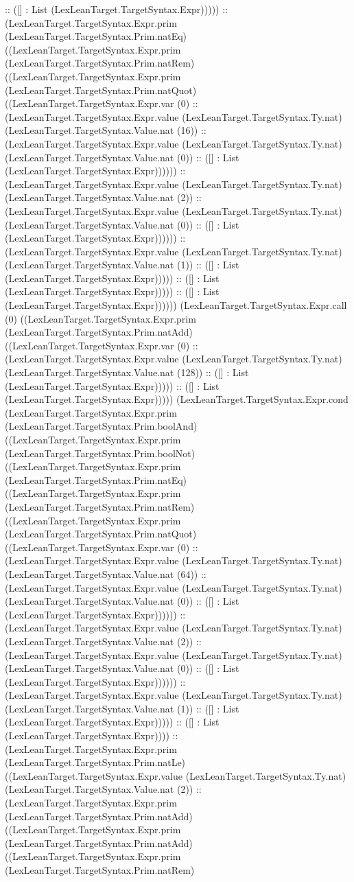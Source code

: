 \documentclass[11pt]{article}
\begin{document}
:: ([] : List (LexLeanTarget.TargetSyntax.Expr))))) :: (LexLeanTarget.TargetSyntax.Expr.prim (LexLeanTarget.TargetSyntax.Prim.natEq) ((LexLeanTarget.TargetSyntax.Expr.prim (LexLeanTarget.TargetSyntax.Prim.natRem) ((LexLeanTarget.TargetSyntax.Expr.prim (LexLeanTarget.TargetSyntax.Prim.natQuot) ((LexLeanTarget.TargetSyntax.Expr.var (0) :: (LexLeanTarget.TargetSyntax.Expr.value (LexLeanTarget.TargetSyntax.Ty.nat) (LexLeanTarget.TargetSyntax.Value.nat (16)) :: (LexLeanTarget.TargetSyntax.Expr.value (LexLeanTarget.TargetSyntax.Ty.nat) (LexLeanTarget.TargetSyntax.Value.nat (0)) :: ([] : List (LexLeanTarget.TargetSyntax.Expr)))))) :: (LexLeanTarget.TargetSyntax.Expr.value (LexLeanTarget.TargetSyntax.Ty.nat) (LexLeanTarget.TargetSyntax.Value.nat (2)) :: (LexLeanTarget.TargetSyntax.Expr.value (LexLeanTarget.TargetSyntax.Ty.nat) (LexLeanTarget.TargetSyntax.Value.nat (0)) :: ([] : List (LexLeanTarget.TargetSyntax.Expr)))))) :: (LexLeanTarget.TargetSyntax.Expr.value (LexLeanTarget.TargetSyntax.Ty.nat) (LexLeanTarget.TargetSyntax.Value.nat (1)) :: ([] : List (LexLeanTarget.TargetSyntax.Expr))))) :: ([] : List (LexLeanTarget.TargetSyntax.Expr))))) :: ([] : List (LexLeanTarget.TargetSyntax.Expr)))))) (LexLeanTarget.TargetSyntax.Expr.call (0) ((LexLeanTarget.TargetSyntax.Expr.prim (LexLeanTarget.TargetSyntax.Prim.natAdd) ((LexLeanTarget.TargetSyntax.Expr.var (0) :: (LexLeanTarget.TargetSyntax.Expr.value (LexLeanTarget.TargetSyntax.Ty.nat) (LexLeanTarget.TargetSyntax.Value.nat (128)) :: ([] : List (LexLeanTarget.TargetSyntax.Expr))))) :: ([] : List (LexLeanTarget.TargetSyntax.Expr))))) (LexLeanTarget.TargetSyntax.Expr.cond (LexLeanTarget.TargetSyntax.Expr.prim (LexLeanTarget.TargetSyntax.Prim.boolAnd) ((LexLeanTarget.TargetSyntax.Expr.prim (LexLeanTarget.TargetSyntax.Prim.boolNot) ((LexLeanTarget.TargetSyntax.Expr.prim (LexLeanTarget.TargetSyntax.Prim.natEq) ((LexLeanTarget.TargetSyntax.Expr.prim (LexLeanTarget.TargetSyntax.Prim.natRem) ((LexLeanTarget.TargetSyntax.Expr.prim (LexLeanTarget.TargetSyntax.Prim.natQuot) ((LexLeanTarget.TargetSyntax.Expr.var (0) :: (LexLeanTarget.TargetSyntax.Expr.value (LexLeanTarget.TargetSyntax.Ty.nat) (LexLeanTarget.TargetSyntax.Value.nat (64)) :: (LexLeanTarget.TargetSyntax.Expr.value (LexLeanTarget.TargetSyntax.Ty.nat) (LexLeanTarget.TargetSyntax.Value.nat (0)) :: ([] : List (LexLeanTarget.TargetSyntax.Expr)))))) :: (LexLeanTarget.TargetSyntax.Expr.value (LexLeanTarget.TargetSyntax.Ty.nat) (LexLeanTarget.TargetSyntax.Value.nat (2)) :: (LexLeanTarget.TargetSyntax.Expr.value (LexLeanTarget.TargetSyntax.Ty.nat) (LexLeanTarget.TargetSyntax.Value.nat (0)) :: ([] : List (LexLeanTarget.TargetSyntax.Expr)))))) :: (LexLeanTarget.TargetSyntax.Expr.value (LexLeanTarget.TargetSyntax.Ty.nat) (LexLeanTarget.TargetSyntax.Value.nat (1)) :: ([] : List (LexLeanTarget.TargetSyntax.Expr))))) :: ([] : List (LexLeanTarget.TargetSyntax.Expr)))) :: (LexLeanTarget.TargetSyntax.Expr.prim (LexLeanTarget.TargetSyntax.Prim.natLe) ((LexLeanTarget.TargetSyntax.Expr.value (LexLeanTarget.TargetSyntax.Ty.nat) (LexLeanTarget.TargetSyntax.Value.nat (2)) :: (LexLeanTarget.TargetSyntax.Expr.prim (LexLeanTarget.TargetSyntax.Prim.natAdd) ((LexLeanTarget.TargetSyntax.Expr.prim (LexLeanTarget.TargetSyntax.Prim.natAdd) ((LexLeanTarget.TargetSyntax.Expr.prim (LexLeanTarget.TargetSyntax.Prim.natRem) 
\end{document}

